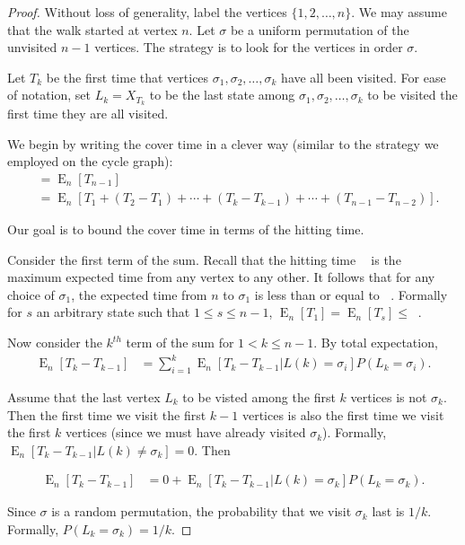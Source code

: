 \documentclass[12pt]{article}
\theoremstyle{definition}
\DeclareMathOperator{\E}{\mathrm{E}}		     %
\DeclareMathOperator{\tcov}{t_\textrm{cov}}      %
\DeclareMathOperator{\hit}{t_{\textrm{hit}}}     %
\begin{document}
\begin{proof}
Without loss of generality, label the vertices $\{1, 2, \dots, n\}$.
We may assume that the walk started at vertex $n$.
Let $\sigma$ be a uniform permutation of the unvisited $n-1$ vertices.
The strategy is to look for the vertices in order $\sigma$.

Let $T_k$ be the first time that vertices $\sigma_1, \sigma_2, \ldots, \sigma_k$
have all been visited.
For ease of notation, set $L_k = X_{T_k}$ to be the last state among 
$\sigma_1, \sigma_2, \ldots, \sigma_k$ to be visited the first
time they are all visited.

We begin by writing the cover time in a clever way
(similar to the strategy we employed on the cycle graph):
\begin{align}
\tcov &= \E_n[{T_{n-1}}]  \nonumber \\
&= \E_n[T_1 + (T_2 - T_1) + \cdots + 
(T_k - T_{k-1}) + \cdots + (T_{n-1} - T_{n-2})] . \nonumber
\end{align}

Our goal is to bound the cover time in terms of the hitting time.

Consider the first term of the sum.
Recall that the hitting time $\hit$ is the maximum
expected time from any vertex to any other.
It follows that for any choice of $\sigma_1$,
the expected time from $n$ to $\sigma_1$ is less than or equal to $\hit$.
Formally for $s$ an arbitrary state such that $1\leq s \leq n-1$,
$\E_n[T_1] = \E_n[T_s] \leq \hit$.

Now consider the $k^{th}$ term of the sum for $1 < k \leq n-1$.
By total expectation,
\begin{align}
\E_n[T_k - T_{k-1}] &=
\sum_{i=1}^k \E_n[T_k - T_{k-1} | L(k) = \sigma_i]
P(L_k = \sigma_i). \nonumber 
\end{align}

Assume that the last vertex $L_k$ to be visted among the first
$k$ vertices is not $\sigma_k$.
Then the first time we visit the first $k-1$ vertices
is also the first time we visit the first $k$ vertices
(since we must have already visited $\sigma_k$).
Formally, $\E_n[T_k-T_{k-1}|L(k) \neq \sigma_k] = 0$.
Then 

\begin{align}
\E_n[T_k - T_{k-1}] &= 0 +
\E_n[T_k - T_{k-1} | L(k) = \sigma_k]
P(L_k = \sigma_k). \nonumber 
\end{align}

Since $\sigma$ is a random permutation, the probability that
we visit $\sigma_k$ last is $1/k$.
Formally, $P(L_k = \sigma_k) = 1/k$.


\end{proof}
\end{document}
